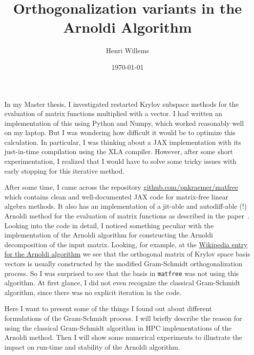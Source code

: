 \documentclass[11pt]{article}
\begin{document}
    \title{Orthogonalization variants in the Arnoldi Algorithm}
    \author{Henri Willems}
    \date{\today}
    \maketitle

In my Master thesis, I investigated restarted Krylov subspace methods for the evaluation of matrix functions multiplied with a vector.
I had written an implementation of this using Python and Numpy, which worked reasonably well on my laptop.
But I was wondering how difficult it would be to optimize this calculation.
In particular, I was thinking about a JAX implementation with its just-in-time compilation using the XLA compiler.
However, after some short experimentation, I realized that I would have to solve some tricky issues with early stopping for this iterative method.

After some time, I came across the repository \url{github.com/pnkraemer/matfree} which contains clean and well-documented JAX code for matrix-free linear algebra methods.
It also has an implementation of a jit-able and autodiff-able (!) Arnoldi method for the evaluation of matrix functions as described in the paper~\cite{kramerGradientsFunctionsLarge2024}.
Looking into the code in detail, I noticed something peculiar with the implementation of the Arnoldi algorithm for constructing the Arnoldi decomposition of the input matrix.
Looking, for example, at the  \href{https://en.wikipedia.org/wiki/Arnoldi_iteration}{Wikipedia entry for the Arnoldi algorithm} we see that the orthogonal matrix of Krylov space basis vectors is usually constructed by the modified Gram-Schmidt orthogonalization process.
So I was surprised to see that the basis in \verb|matfree| was not using this algorithm.
At first glance, I did not even recognize the classical Gram-Schmidt algorithm, since there was no explicit iteration in the code.

Here I want to present some of the things I found out about different formulations of the Gram-Schmidt process.
I will briefly describe the reason for using the classical Gram-Schmidt algorithm in HPC implementations of the Arnoldi method.
Then I will show some numerical experiments to illustrate the impact on run-time and stability of the Arnoldi algorithm.
\end{document}
